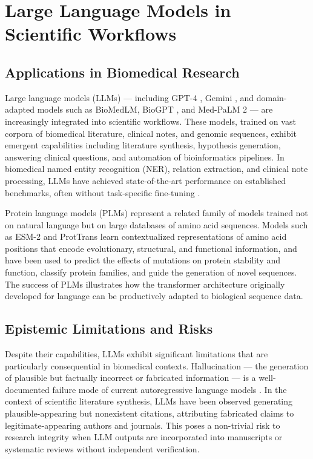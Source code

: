 \section{Large Language Models in Scientific Workflows}

\subsection{Applications in Biomedical Research}

Large language models (LLMs) --- including GPT-4 \parencite{openai2023}, Gemini \parencite{googledeepming2023}, and domain-adapted models such as BioMedLM, BioGPT \parencite{luo2022}, and Med-PaLM 2 \parencite{singhal2023} --- are increasingly integrated into scientific workflows. These models, trained on vast corpora of biomedical literature, clinical notes, and genomic sequences, exhibit emergent capabilities including literature synthesis, hypothesis generation, answering clinical questions, and automation of bioinformatics pipelines. In biomedical named entity recognition (NER), relation extraction, and clinical note processing, LLMs have achieved state-of-the-art performance on established benchmarks, often without task-specific fine-tuning \parencite{wei2022}.

Protein language models (PLMs) represent a related family of models trained not on natural language but on large databases of amino acid sequences. Models such as ESM-2 \parencite{lin2023} and ProtTrans \parencite{elnaggar2022} learn contextualized representations of amino acid positions that encode evolutionary, structural, and functional information, and have been used to predict the effects of mutations on protein stability and function, classify protein families, and guide the generation of novel sequences. The success of PLMs illustrates how the transformer architecture originally developed for language can be productively adapted to biological sequence data.

\subsection{Epistemic Limitations and Risks}

Despite their capabilities, LLMs exhibit significant limitations that are particularly consequential in biomedical contexts. Hallucination --- the generation of plausible but factually incorrect or fabricated information --- is a well-documented failure mode of current autoregressive language models \parencite{ji2023}. In the context of scientific literature synthesis, LLMs have been observed generating plausible-appearing but nonexistent citations, attributing fabricated claims to legitimate-appearing authors and journals. This poses a non-trivial risk to research integrity when LLM outputs are incorporated into manuscripts or systematic reviews without independent verification.

